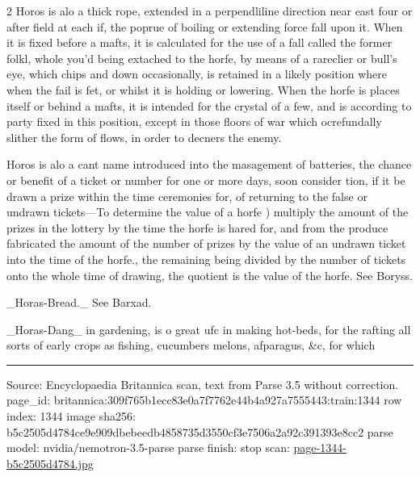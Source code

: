 \documentclass[10pt]{article}
\begin{document}
\begin{multicols}{2}
Horos is alo a thick rope, extended in a perpendliline direction near east four or after field at each if, the poprue of boiling or extending force fall upon it. When it is fixed before a mafts, it is calculated for the use of a fall called the former folkl, whole you'd being extached to the horfe, by means of a rareclier or bull's eye, which chips and down occasionally, is retained in a likely position where when the fail is fet, or whilst it is holding or lowering. When the horfe is places itself or behind a mafts, it is intended for the crystal of a few, and is according to party fixed in this position, except in those floors of war which ocrefundally slither the form of flows, in order to decners the enemy.

Horos is alo a cant name introduced into the masagement of batteries, the chance or benefit of a ticket or number for one or more days, soon consider tion, if it be drawn a prize within the time ceremonies for, of returning to the false or undrawn tickets—To determine the value of a horfe ) multiply the amount of the prizes in the lottery by the time the horfe is hared for, and from the produce fabricated the amount of the number of prizes by the value of an undrawn ticket into the time of the horfe., the remaining being divided by the number of tickets onto the whole time of drawing, the quotient is the value of the horfe. See Boryss.

\_Horas-Bread.\_ See Barxad.

\_Horas-Dang\_ in gardening, is o great ufc in making hot-beds, for the rafting all sorts of early crops as fishing, cucumbers melons, afparagus, \&c, for which

\end{multicols}
\vfill\par\noindent\rule{\linewidth}{0.4pt}\par
{\scriptsize\color{gray}\noindent Source: Encyclopaedia Britannica scan, text from Parse 3.5 without correction. page\_id: britannica:309f765b1ecc83e0a7f7762e44b4a927a7555443:train:1344 \quad row index: 1344 \quad image sha256: b5c2505d4784ce9e909dbebeedb4858735d3550cf3e7506a2a92c391393e8cc2 \quad parse model: nvidia/nemotron-3.5-parse \quad parse finish: stop \quad scan: \href{../scans/page-1344-b5c2505d4784.jpg}{page-1344-b5c2505d4784.jpg}\par}
\end{document}
